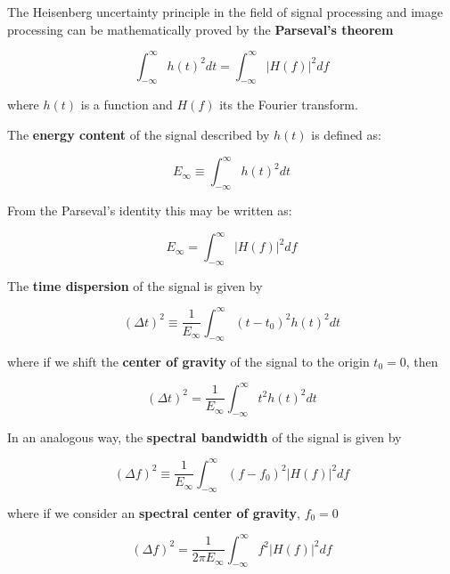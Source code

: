 The Heisenberg uncertainty principle in the field of signal processing and image processing can be mathematically proved by the \textbf{Parseval's theorem}

\begin{equation}\label{eq:parseval_theorem}
	\int_{-\infty}^{\infty} h(t)^2 dt =  \int_{-\infty}^{\infty} |H(f)|^2 df
\end{equation}

where $h(t)$ is a function and $H(f)$ its the Fourier transform. 

The \textbf{energy content} of the signal described by $h(t)$ is defined as:

\begin{equation}\label{eq:energy_content_time}
    E_{\infty} \equiv \int_{-\infty}^{\infty}  h(t)^2 dt
\end{equation}


From the Parseval's identity this may be written as:

\begin{equation}\label{eq:energy_content_frequency}
    E_{\infty} =  \int_{-\infty}^{\infty} |H(f)|^2 df
\end{equation}

The \textbf{time dispersion} of the signal is given by

\begin{equation}\label{eq:time_dispersion_no_centered}
    (\Delta t)^2 \equiv \frac{1}{E_{\infty}} \int_{-\infty}^{\infty} (t-t_{0})^2 h(t)^2 dt
\end{equation}

where if we shift the \textbf{center of gravity} of the signal to the origin $t_{0}=0$, then

\begin{equation}\label{eq:time_dispersion}
    (\Delta t)^2 = \frac{1}{E_{\infty}} \int_{-\infty}^{\infty} t^2 h(t)^2 dt
\end{equation}

In an analogous way, the \textbf{spectral bandwidth} of the signal is given by

\begin{equation}\label{eq:spectral_bandwidth_no_centered}
    (\Delta f)^2 \equiv \frac{1}{E_{\infty}} \int_{-\infty}^{\infty} (f-f_{0})^2 |H(f)|^2 df
\end{equation}

where if we consider an \textbf{spectral center of gravity}, $f_{0}=0$

\begin{equation}\label{eq:spectral_bandwidth}
    (\Delta f)^2 = \frac{1}{2 \pi E_{\infty}} \int_{-\infty}^{\infty} f^2 |H(f)|^2 df 
\end{equation}

